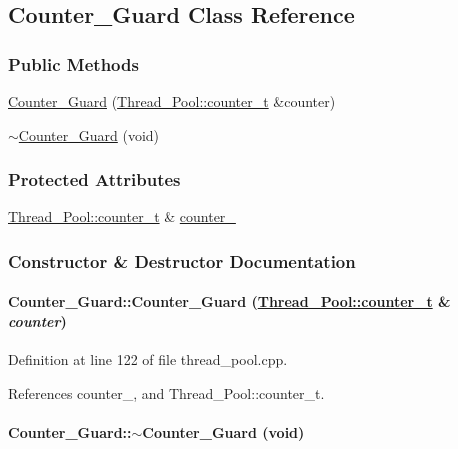 \hypertarget{classCounter__Guard}{
\subsection{Counter\_\-Guard Class Reference}
\label{classCounter__Guard}
}
\subsubsection*{Public Methods}
\begin{CompactItemize}
\item 
\hyperlink{classCounter__Guard_Counter__Guarda0}{Counter\_\-Guard} (\hyperlink{classThread__Pool_Thread__Pools1}{Thread\_\-Pool::counter\_\-t} \&counter)
\item 
\hyperlink{classCounter__Guard_Counter__Guarda1}{$\sim$Counter\_\-Guard} (void)
\end{CompactItemize}
\subsubsection*{Protected Attributes}
\begin{CompactItemize}
\item 
\hyperlink{classThread__Pool_Thread__Pools1}{Thread\_\-Pool::counter\_\-t} \& \hyperlink{classCounter__Guard_Counter__Guardn0}{counter\_\-}
\end{CompactItemize}


\subsubsection{Constructor \& Destructor Documentation}
\hypertarget{classCounter__Guard_Counter__Guarda0}{
\paragraph[Counter\_\-Guard]{\setlength{\rightskip}{0pt plus 5cm}Counter\_\-Guard::Counter\_\-Guard (\hyperlink{classThread__Pool_Thread__Pools1}{Thread\_\-Pool::counter\_\-t} \& {\em counter})}\hfill}
\label{classCounter__Guard_Counter__Guarda0}




Definition at line 122 of file thread\_\-pool.cpp.

References counter\_\-, and Thread\_\-Pool::counter\_\-t.\hypertarget{classCounter__Guard_Counter__Guarda1}{
\paragraph[$\sim$Counter\_\-Guard]{\setlength{\rightskip}{0pt plus 5cm}Counter\_\-Guard::$\sim$Counter\_\-Guard (void)}\hfill}
\label{classCounter__Guard_Counter__Guarda1}




